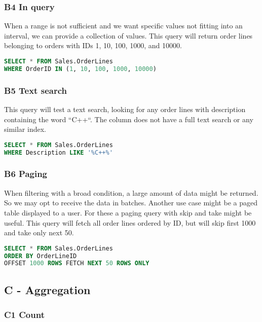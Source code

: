 \subsubsection*{B4 In query}
When a range is not sufficient and we want specific values not fitting into an interval, we can provide a collection of values.
This query will return order lines belonging to orders with IDs 1, 10, 100, 1000, and 10000.

\begin{lstlisting}[language=SQL]
SELECT * FROM Sales.OrderLines 
WHERE OrderID IN (1, 10, 100, 1000, 10000)
\end{lstlisting}

\subsubsection*{B5 Text search}
This query will test a text search, looking for any order lines with description containing the word ``C++``.  The column does not have a full text search or any similar index.

\begin{lstlisting}[language=SQL]
SELECT * FROM Sales.OrderLines 
WHERE Description LIKE '%C++%'
\end{lstlisting}

\subsubsection*{B6 Paging}
When filtering with a broad condition, a large amount of data might be returned. So we may opt to receive the data in batches. Another use case might be a paged table displayed to a user. For these a paging query with skip and take might be useful.
This query will fetch all order lines ordered by ID, but will skip first 1000 and take only next 50.

\begin{lstlisting}[language=SQL]
SELECT * FROM Sales.OrderLines 
ORDER BY OrderLineID 
OFFSET 1000 ROWS FETCH NEXT 50 ROWS ONLY
\end{lstlisting}

\subsection{C - Aggregation}

\subsubsection*{C1 Count}


